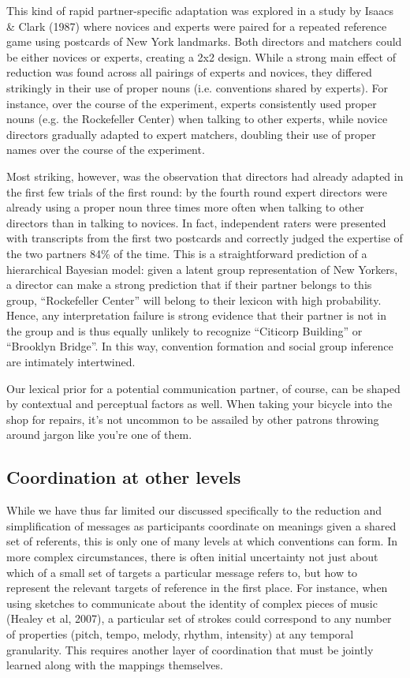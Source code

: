 \documentclass[11pt, floatsintext, jou]{apa6}
\begin{document}
This kind of rapid partner-specific adaptation was explored in a study by Isaacs \& Clark (1987) where novices and experts were paired for a repeated reference game using postcards of New York landmarks. Both directors and matchers could be either novices or experts, creating a 2x2 design. While a strong main effect of reduction was found across all pairings of experts and novices, they differed strikingly in their use of proper nouns (i.e. conventions shared by experts). For instance, over the course of the experiment, experts consistently used proper nouns (e.g. the Rockefeller Center) when talking to other experts, while novice directors gradually adapted to expert matchers, doubling their use of proper names over the course of the experiment.

Most striking, however, was the observation that directors had already adapted in the first few trials of the first round: by the fourth round expert directors were already using a proper noun three times more often when talking to other directors than in talking to novices. In fact, independent raters were presented with transcripts from the first two postcards and correctly judged the expertise of the two partners 84\% of the time. This is a straightforward prediction of a hierarchical Bayesian model: given a latent group representation of New Yorkers, a director can make a strong prediction that if their partner belongs to this group, ``Rockefeller Center'' will belong to their lexicon with high probability. Hence, any interpretation failure is strong evidence that their partner is not in the group and is thus equally unlikely to recognize ``Citicorp Building'' or ``Brooklyn Bridge''. In this way, convention formation and social group inference are intimately intertwined. 

Our lexical prior for a potential communication partner, of course, can be shaped by contextual and perceptual factors as well. When taking your bicycle into the shop for repairs, it's not uncommon to be assailed by other patrons throwing around jargon like you're one of them. 

\subsection{Coordination at other levels}

While we have thus far limited our discussed specifically to the reduction and simplification of messages as participants coordinate on meanings given a shared set of referents, this is only one of many levels at which conventions can form. In more complex circumstances, there is often initial uncertainty not just about which of a small set of targets a particular message refers to, but how to represent the relevant targets of reference in the first place. For instance, when using sketches to communicate about the identity of complex pieces of music (Healey et al, 2007), a particular set of strokes could correspond to any number of properties (pitch, tempo, melody, rhythm, intensity) at any temporal granularity. This requires another layer of coordination that must be jointly learned along with the mappings themselves. 
\end{document}
